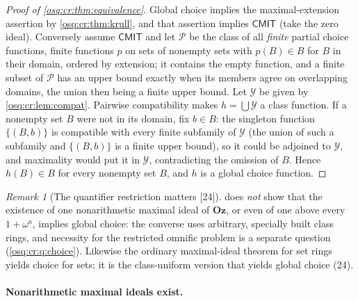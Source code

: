 \documentclass[11pt,letterpaper]{article}
\numberwithin{equation}{section}
\theoremstyle{definition}
\theoremstyle{remark}
\newtheorem{remark}[remark]{Remark}
\theoremstyle{plain}
\newcommand{\Oz}{\mathbf{Oz}}
\newcommand{\src}[1]{\textup{\textsf{[#1]}}}
\begin{document}
\begin{proof}[Proof of \cref{osq:cr:thm:equivalence}]
Global choice implies the maximal-extension assertion by \cref{osq:cr:thm:krull}, and that assertion implies $\mathsf{CMIT}$ (take the zero ideal).
Conversely assume $\mathsf{CMIT}$ and let $\mathcal P$ be the class of all \emph{finite} partial choice functions, finite functions $p$ on sets of
nonempty sets with $p(B)\in B$ for $B$ in their domain, ordered by extension; it contains the empty function, and a finite subset of $\mathcal P$ has an
upper bound exactly when its members agree on overlapping domains, the union then being a finite upper bound. Let $\mathcal Y$ be given by
\cref{osq:cr:lem:compat}. Pairwise compatibility makes $h=\bigcup\mathcal Y$ a class function. If a nonempty set $B$ were not in its domain, fix
$b\in B$: the singleton function $\{(B,b)\}$ is compatible with every finite subfamily of $\mathcal Y$ (the union of such a subfamily and
$\{(B,b)\}$ is a finite upper bound), so it could be adjoined to $\mathcal Y$, and maximality would put it in $\mathcal Y$, contradicting the omission of
$B$. Hence $h(B)\in B$ for every nonempty set $B$, and $h$ is a global choice function.
\end{proof}

\begin{remark}[The quantifier restriction matters \src{24}]\label{osq:cr:rem:restricted}
 does \emph{not} show that the existence of one nonarithmetic maximal ideal of $\Oz$, or even of one above every
$1+\omega^a$, implies global choice: the converse uses arbitrary, specially built class rings, and necessity for the restricted omnific problem is a
separate question (\cref{osq:cr:q:choice}). Likewise the ordinary maximal-ideal theorem for set rings yields choice for sets; it is the class-uniform
version that yields global choice (24).
\end{remark}

\paragraph{Nonarithmetic maximal ideals exist.}
\end{document}
